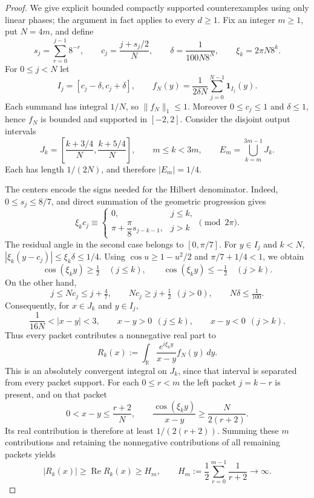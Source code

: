 \documentclass[11pt]{article}
\numberwithin{equation}{section}
\theoremstyle{remark}
\theoremstyle{definition}
\newcommand{\R}{\mathbb R}
\begin{document}
\begin{proof}
We give explicit bounded compactly supported counterexamples using only
linear phases; the argument in fact applies to every $d\ge1$.
Fix an integer $m\ge1$, put $N=4m$, and define
\[
 s_j=\sum_{r=0}^{j-1}8^{-r},\qquad
 c_j=\frac{j+s_j/2}{N},\qquad
 \delta=\frac{1}{100N8^N},\qquad
 \xi_k=2\pi N8^k.
\]
For $0\le j<N$ let
\[
 I_j=[c_j-\delta,c_j+\delta],\qquad
 f_N(y)=\frac{1}{2\delta N}\sum_{j=0}^{N-1}\mathbf1_{I_j}(y).
\]
Each summand has integral $1/N$, so $\|f_N\|_1\le1$.
Moreover $0\le c_j\le1$ and $\delta\le1$, hence $f_N$ is bounded
and supported in $[-2,2]$. Consider the disjoint output intervals
\[
 J_k=\left[\frac{k+3/4}{N},\frac{k+5/4}{N}\right],\qquad
 m\le k<3m,\qquad E_m=\bigcup_{k=m}^{3m-1}J_k.
\]
Each has length $1/(2N)$, and therefore $|E_m|=1/4$.

The centers encode the signs needed for the Hilbert denominator. Indeed,
$0\le s_j\le8/7$, and direct summation of the geometric progression gives
\[
 \xi_kc_j\equiv
 \begin{cases}
 0,&j\le k,\\
 \pi+\dfrac{\pi}{8}s_{j-k-1},&j>k
 \end{cases}
 \pmod{2\pi}.
\]
The residual angle in the second case belongs to $[0,\pi/7]$.
For $y\in I_j$ and $k<N$,
$|\xi_k(y-c_j)|\le\xi_k\delta\le1/4$.
Using $\cos u\ge1-u^2/2$ and $\pi/7+1/4<1$, we obtain
\[
 \cos(\xi_ky)\ge\tfrac12\quad(j\le k),\qquad
 \cos(\xi_ky)\le-\tfrac12\quad(j>k).
\]
On the other hand,
\[
 j\le Nc_j\le j+\tfrac47,\qquad
 Nc_j\ge j+\tfrac12\ \ (j>0),\qquad N\delta\le\tfrac1{100}.
\]
Consequently, for $x\in J_k$ and $y\in I_j$,
\[
 \frac1{16N}<|x-y|<3,\qquad
 x-y>0\ \ (j\le k),\qquad x-y<0\ \ (j>k).
\]
Thus every packet contributes a nonnegative real part to
\[
 R_k(x):=\int_{\R}\frac{e^{i\xi_ky}}{x-y}f_N(y)\,dy.
\]
This is an absolutely convergent integral on $J_k$, since that interval
is separated from every packet support. For each $0\le r<m$ the left
packet $j=k-r$ is present, and on that packet
\[
 0<x-y\le\frac{r+2}{N},\qquad
 \frac{\cos(\xi_ky)}{x-y}\ge\frac{N}{2(r+2)}.
\]
Its real contribution is therefore at least $1/(2(r+2))$. Summing these
$m$ contributions and retaining the nonnegative contributions of all
remaining packets yields
\[
 |R_k(x)|\ge\operatorname{Re}R_k(x)\ge H_m,
 \qquad H_m:=\frac12\sum_{r=0}^{m-1}\frac1{r+2}
 \longrightarrow\infty.
\]


\end{proof}
\end{document}
